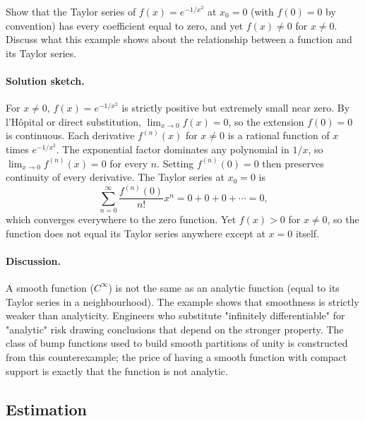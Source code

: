 \begin{exercise}
Show that the Taylor series of $f(x) = e^{-1/x^{2}}$ at $x_{0} = 0$
(with $f(0) = 0$ by convention) has every coefficient equal to zero,
and yet $f(x) \neq 0$ for $x \neq 0$. Discuss what this example shows
about the relationship between a function and its Taylor series.

\paragraph{Solution sketch.} For $x \neq 0$, $f(x) = e^{-1/x^{2}}$ is
strictly positive but extremely small near zero. By l'H\^{o}pital or
direct substitution, $\lim_{x \to 0} f(x) = 0$, so the extension
$f(0) = 0$ is continuous. Each derivative $f^{(n)}(x)$ for $x \neq 0$
is a rational function of $x$ times $e^{-1/x^{2}}$. The exponential
factor dominates any polynomial in $1/x$, so $\lim_{x \to 0} f^{(n)}(x)
= 0$ for every $n$. Setting $f^{(n)}(0) = 0$ then preserves continuity
of every derivative. The Taylor series at $x_{0} = 0$ is
\[
\sum_{n=0}^{\infty} \frac{f^{(n)}(0)}{n!} x^{n} = 0 + 0 + 0 + \cdots
= 0,
\]
which converges everywhere to the zero function. Yet $f(x) > 0$ for
$x \neq 0$, so the function does not equal its Taylor series anywhere
except at $x = 0$ itself.

\paragraph{Discussion.} A smooth function ($C^{\infty}$) is not the
same as an analytic function (equal to its Taylor series in a
neighbourhood). The example shows that smoothness is strictly weaker
than analyticity. Engineers who substitute "infinitely differentiable"
for "analytic" risk drawing conclusions that depend on the stronger
property. The class of bump functions used to build smooth partitions
of unity is constructed from this counterexample; the price of
having a smooth function with compact support is exactly that the
function is not analytic.
\end{exercise}

\subsection*{Estimation}

